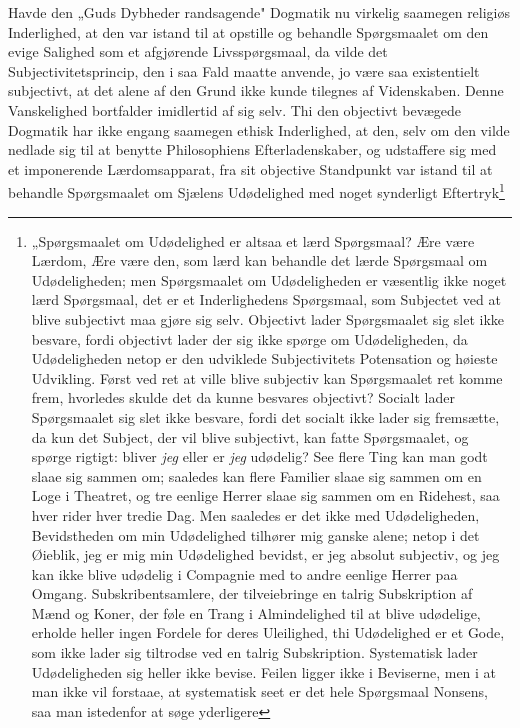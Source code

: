 \documentclass[12pt]{book}
\newcommand{\opage}[1]{\marginnote{\footnotesize\textit{[#1]}}}
\begin{document}
Havde den „Guds Dybheder randsagende" Dogmatik nu virkelig saamegen religiøs
Inderlighed, at den var istand til at opstille og behandle Spørgsmaalet om den
evige Salighed som et afgjørende Livsspørgsmaal, da vilde det
Subjectivitetsprincip, den i saa Fald maatte anvende, jo være saa existentielt
subjectivt, at det alene af den Grund ikke kunde tilegnes af
\opage{47} Videnskaben. Denne Vanskelighed bortfalder imidlertid af sig selv. Thi den
objectivt bevægede Dogmatik har ikke engang saamegen ethisk Inderlighed, at den,
selv om den vilde nedlade sig til at benytte Philosophiens Efterladenskaber, og
udstaffere sig med et imponerende Lærdomsapparat, fra sit objective Standpunkt
var istand til at behandle Spørgsmaalet om Sjælens Udødelighed med noget
synderligt Eftertryk\footnote{„Spørgsmaalet om Udødelighed er altsaa et lærd
Spørgsmaal? Ære være Lærdom, Ære være den, som lærd kan behandle det lærde
Spørgsmaal om Udødeligheden; men Spørgsmaalet om Udødeligheden er væsentlig ikke
noget lærd Spørgsmaal, det er et Inderlighedens Spørgsmaal, som Subjectet ved at
blive subjectivt maa gjøre sig selv. Objectivt lader Spørgsmaalet sig slet ikke
besvare, fordi objectivt lader der sig ikke spørge om Udødeligheden, da
Udødeligheden netop er den udviklede Subjectivitets Potensation og høieste
Udvikling. Først ved ret at ville blive subjectiv kan Spørgsmaalet ret komme
frem, hvorledes skulde det da kunne besvares objectivt? Socialt lader
Spørgsmaalet sig slet ikke besvare, fordi det socialt ikke lader sig fremsætte,
da kun det Subject, der vil blive subjectivt, kan fatte Spørgsmaalet, og spørge
rigtigt: bliver \emph{jeg} eller er \emph{jeg} udødelig? See flere Ting kan man
godt slaae sig sammen om; saaledes kan flere Familier slaae sig sammen om en Loge
i Theatret, og tre eenlige Herrer slaae sig sammen om en Ridehest, saa hver rider
hver tredie Dag. Men saaledes er det ikke med Udødeligheden, Bevidstheden om min
Udødelighed tilhører mig ganske alene; netop i det Øieblik, jeg er mig min
Udødelighed bevidst, er jeg absolut subjectiv, og jeg kan ikke blive udødelig i
Compagnie med to andre eenlige Herrer paa Omgang. Subskribentsamlere, der
tilveiebringe en talrig Subskription af Mænd og Koner, der føle en Trang i
Almindelighed til at blive udødelige, erholde heller ingen Fordele for deres
Uleilighed, thi Udødelighed er et Gode, som ikke lader sig tiltrodse ved en
talrig Subskription. Systematisk lader Udødeligheden sig heller ikke bevise.
Feilen ligger ikke i Beviserne, men i at man ikke vil forstaae, at systematisk
seet er det hele Spørgsmaal Nonsens, saa man istedenfor at søge yderligere
}
\end{document}
